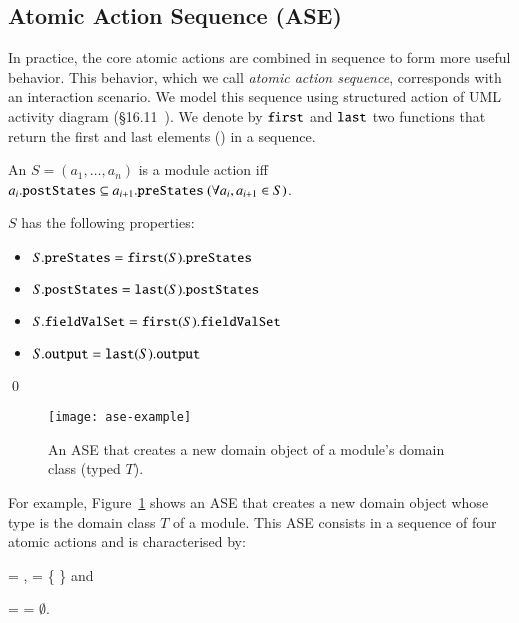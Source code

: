 \subsection{Atomic Action Sequence (ASE)} \label{sect:arch-ase}
In practice, the core atomic actions are combined in sequence to form more useful behavior. This behavior, which we call \textit{atomic action sequence}, corresponds with an interaction scenario. We model this sequence using structured action of UML activity diagram (\S{16.11}~\cite{omg_unified_2015}).
%
We denote by $ \func{first}$ and $ \func{last}$ two functions that return the first and last elements (\resp) in a sequence.
%
\begin{definition} \label{def:ase}
An  $S = (a_1,\dots,a_n)$ is a module action iff $a_i.{\tt postStates} \subseteq a_{i+1}.{\tt preStates} ~(\forall a_i, a_{i+1} \in S)$.

$S$ has the following properties:
\begin{itemize}
\item $S.\membern{preStates} = \func{first}(S).\membern{preStates}$
\item $S.\membern{postStates} = \func{last}(S).\membern{postStates}$ 
\item $S.\membern{fieldValSet} = \func{first}(S).\membern{fieldValSet}$
\item $S.\membern{output} = \func{last}(S).\membern{output}$ 
\end{itemize}
%
\qed
\end{definition}

%
\begin{figure}[ht]
	\centering
	\texttt{[image: ase-example]}
	\caption{An ASE that creates a new domain object of a module's domain class (typed $T$).} %
	\label{fig:ase-example}
\end{figure}

For example, Figure~\ref{fig:ase-example} shows an ASE that creates a new domain object whose type is the domain class $T$ of a module. This ASE consists in a sequence of four atomic actions and is characterised by:

  = ,  = \{  \} and

  =  = $\emptyset$.

